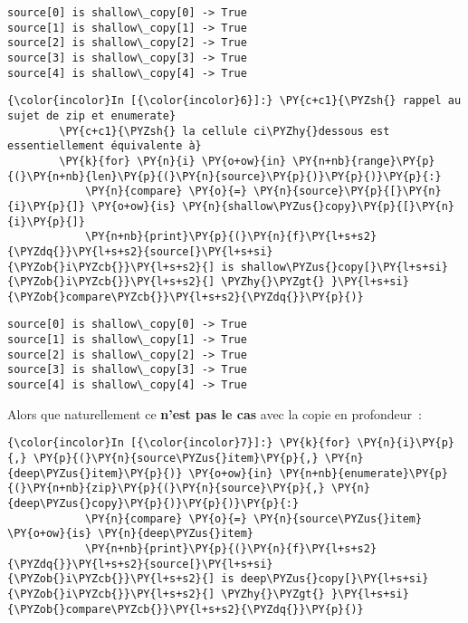     \begin{Verbatim}[commandchars=\\\{\},frame=single,framerule=0.3mm,rulecolor=\color{cellframecolor}]
source[0] is shallow\_copy[0] -> True
source[1] is shallow\_copy[1] -> True
source[2] is shallow\_copy[2] -> True
source[3] is shallow\_copy[3] -> True
source[4] is shallow\_copy[4] -> True
\end{Verbatim}

    \begin{Verbatim}[commandchars=\\\{\},frame=single,framerule=0.3mm,rulecolor=\color{cellframecolor}]
{\color{incolor}In [{\color{incolor}6}]:} \PY{c+c1}{\PYZsh{} rappel au sujet de zip et enumerate}
        \PY{c+c1}{\PYZsh{} la cellule ci\PYZhy{}dessous est essentiellement équivalente à}
        \PY{k}{for} \PY{n}{i} \PY{o+ow}{in} \PY{n+nb}{range}\PY{p}{(}\PY{n+nb}{len}\PY{p}{(}\PY{n}{source}\PY{p}{)}\PY{p}{)}\PY{p}{:}
            \PY{n}{compare} \PY{o}{=} \PY{n}{source}\PY{p}{[}\PY{n}{i}\PY{p}{]} \PY{o+ow}{is} \PY{n}{shallow\PYZus{}copy}\PY{p}{[}\PY{n}{i}\PY{p}{]}
            \PY{n+nb}{print}\PY{p}{(}\PY{n}{f}\PY{l+s+s2}{\PYZdq{}}\PY{l+s+s2}{source[}\PY{l+s+si}{\PYZob{}i\PYZcb{}}\PY{l+s+s2}{] is shallow\PYZus{}copy[}\PY{l+s+si}{\PYZob{}i\PYZcb{}}\PY{l+s+s2}{] \PYZhy{}\PYZgt{} }\PY{l+s+si}{\PYZob{}compare\PYZcb{}}\PY{l+s+s2}{\PYZdq{}}\PY{p}{)}
\end{Verbatim}


    \begin{Verbatim}[commandchars=\\\{\},frame=single,framerule=0.3mm,rulecolor=\color{cellframecolor}]
source[0] is shallow\_copy[0] -> True
source[1] is shallow\_copy[1] -> True
source[2] is shallow\_copy[2] -> True
source[3] is shallow\_copy[3] -> True
source[4] is shallow\_copy[4] -> True
\end{Verbatim}

    Alors que naturellement ce \textbf{n'est pas le cas} avec la copie en
profondeur~:

    \begin{Verbatim}[commandchars=\\\{\},frame=single,framerule=0.3mm,rulecolor=\color{cellframecolor}]
{\color{incolor}In [{\color{incolor}7}]:} \PY{k}{for} \PY{n}{i}\PY{p}{,} \PY{p}{(}\PY{n}{source\PYZus{}item}\PY{p}{,} \PY{n}{deep\PYZus{}item}\PY{p}{)} \PY{o+ow}{in} \PY{n+nb}{enumerate}\PY{p}{(}\PY{n+nb}{zip}\PY{p}{(}\PY{n}{source}\PY{p}{,} \PY{n}{deep\PYZus{}copy}\PY{p}{)}\PY{p}{)}\PY{p}{:}
            \PY{n}{compare} \PY{o}{=} \PY{n}{source\PYZus{}item} \PY{o+ow}{is} \PY{n}{deep\PYZus{}item}
            \PY{n+nb}{print}\PY{p}{(}\PY{n}{f}\PY{l+s+s2}{\PYZdq{}}\PY{l+s+s2}{source[}\PY{l+s+si}{\PYZob{}i\PYZcb{}}\PY{l+s+s2}{] is deep\PYZus{}copy[}\PY{l+s+si}{\PYZob{}i\PYZcb{}}\PY{l+s+s2}{] \PYZhy{}\PYZgt{} }\PY{l+s+si}{\PYZob{}compare\PYZcb{}}\PY{l+s+s2}{\PYZdq{}}\PY{p}{)}
\end{Verbatim}


